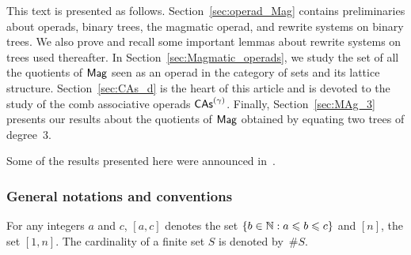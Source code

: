 This text is presented as follows. Section~\ref{sec:operad_Mag} contains
preliminaries about operads, binary trees, the magmatic operad, and
rewrite systems on binary trees. We also prove and recall some important
lemmas about rewrite systems on trees used thereafter. In
Section~\ref{sec:Magmatic_operads}, we study the set of all the
quotients of $\mathsf{Mag}$ seen as an operad in the category of sets and its
lattice structure. Section~\ref{sec:CAs_d} is the heart of this article
and is devoted to the study of the comb associative operads
$\mathsf{CAs}^{\left(\gamma\right)}$. Finally, Section~\ref{sec:MAg_3} presents our results
about the quotients of $\mathsf{Mag}$ obtained by equating two trees of
degree~$3$.
\medbreak

Some of the results presented here were announced in~\cite{CCG18}.
\medbreak

\subsubsection*{General notations and conventions}
For any integers $a$ and $c$, $[a, c]$ denotes the set
$\{b \in \mathbb{N} : a \leqslant b \leqslant c\}$ and $[n]$, the set $[1, n]$. The
cardinality of a finite set $S$ is denoted by~$\# S$.
\medbreak
